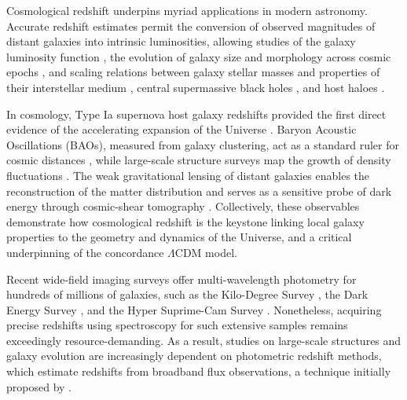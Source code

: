 Cosmological redshift underpins myriad applications in modern astronomy. Accurate redshift estimates permit the conversion of observed magnitudes of distant galaxies into intrinsic luminosities, allowing studies of the galaxy luminosity function \citep[e.g.][]{1976ApJ...203..297S, 2015ApJ...810...71F, 2023MNRAS.523.1009B}, the evolution of galaxy size and morphology across cosmic epochs \citep[e.g.][]{2014ARA&A..52..291C, 2015ApJS..219...15S}, and scaling relations between galaxy stellar masses and properties of their interstellar medium \citep[e.g.][]{1998ApJ...498..541K, 2004ApJ...613..898T}, central supermassive black holes \citep[e.g.][]{2013ARA&A..51..511K}, and host haloes \citep[e.g.][]{2013ApJ...770...57B, 2018ARA&A..56..435W}.

In cosmology, Type Ia supernova host galaxy redshifts provided the first direct evidence of the accelerating expansion of the Universe \citep{1998AJ....116.1009R, 1999ApJ...517..565P}. Baryon Acoustic Oscillations (BAOs), measured from galaxy clustering, act as a standard ruler for cosmic distances \citep{2005ApJ...633..560E}, while large-scale structure surveys map the growth of density fluctuations \citep{1980lssu.book.....P, 2006Natur.440.1137S}. The weak gravitational lensing of distant galaxies \citep{1990ApJ...349L...1T, 1998ApJ...498...26K, 2001PhR...340..291B} enables the reconstruction of the matter distribution and serves as a sensitive probe of dark energy through cosmic-shear tomography \citep{2015RPPh...78h6901K}. Collectively, these observables demonstrate how cosmological redshift is the keystone linking local galaxy properties to the geometry and dynamics of the Universe, and a critical underpinning of the concordance \(\Lambda\)CDM model.

Recent wide-field imaging surveys offer multi-wavelength photometry for hundreds of millions of galaxies, such as the Kilo-Degree Survey \citep[KiDS\footnote{\url{https://kids.strw.leidenuniv.nl}};][]{2024A&A...686A.170W}, the Dark Energy Survey \citep[DES\footnote{\url{https://www.darkenergysurvey.org}};][]{2025arXiv250105739B}, and the Hyper Suprime-Cam Survey \citep[HSC\footnote{\url{https://hsc.mtk.nao.ac.jp/ssp/}};][]{2022PASJ...74..421L}. Nonetheless, acquiring precise redshifts using spectroscopy for such extensive samples remains exceedingly resource-demanding. As a result, studies on large-scale structures and galaxy evolution are increasingly dependent on photometric redshift methods, which estimate redshifts from broadband flux observations, a technique initially proposed by \citet{1985AJ.....90..418K, 1986ApJ...303..154L}.


